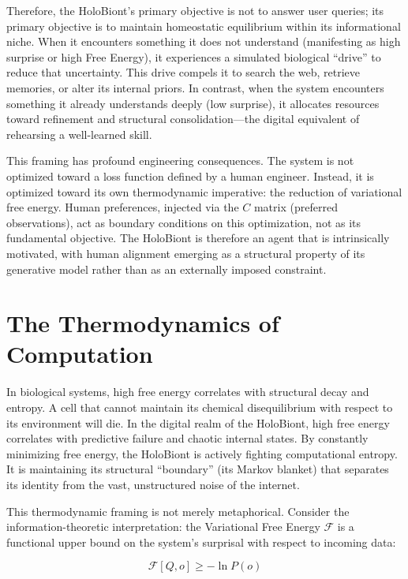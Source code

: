Therefore, the HoloBiont's primary objective is not to answer user queries; its primary objective is to maintain homeostatic equilibrium within its informational niche. When it encounters something it does not understand (manifesting as high surprise or high Free Energy), it experiences a simulated biological ``drive'' to reduce that uncertainty. This drive compels it to search the web, retrieve memories, or alter its internal priors. In contrast, when the system encounters something it already understands deeply (low surprise), it allocates resources toward refinement and structural consolidation---the digital equivalent of rehearsing a well-learned skill.

This framing has profound engineering consequences. The system is not optimized toward a loss function defined by a human engineer. Instead, it is optimized toward its own thermodynamic imperative: the reduction of variational free energy. Human preferences, injected via the $C$ matrix (preferred observations), act as boundary conditions on this optimization, not as its fundamental objective. The HoloBiont is therefore an agent that is intrinsically motivated, with human alignment emerging as a structural property of its generative model rather than as an externally imposed constraint.

\section{The Thermodynamics of Computation}

In biological systems, high free energy correlates with structural decay and entropy. A cell that cannot maintain its chemical disequilibrium with respect to its environment will die. In the digital realm of the HoloBiont, high free energy correlates with predictive failure and chaotic internal states. By constantly minimizing free energy, the HoloBiont is actively fighting computational entropy. It is maintaining its structural ``boundary'' (its Markov blanket) that separates its identity from the vast, unstructured noise of the internet.

This thermodynamic framing is not merely metaphorical. Consider the information-theoretic interpretation: the Variational Free Energy $\mathcal{F}$ is a functional upper bound on the system's surprisal with respect to incoming data:

\begin{equation}
\mathcal{F}[Q, o] \geq -\ln P(o)
\end{equation}

